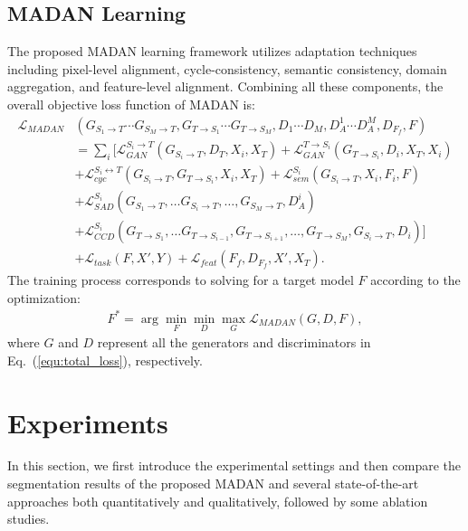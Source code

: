 \documentclass{article}
\begin{document}
\subsection{MADAN Learning}
The proposed MADAN learning framework utilizes adaptation techniques including pixel-level alignment, cycle-consistency, semantic consistency, domain aggregation, and feature-level alignment. Combining all these components, the overall objective loss function of MADAN is:
\begin{equation}
\begin{aligned}
\mathcal{L}_{MADAN}&(G_{S_1\rightarrow T} \cdots G_{S_M\rightarrow T}, G_{T\rightarrow S_1} \cdots G_{T\rightarrow S_M}, D_1\cdots D_M, D_A^1 \cdots D_A^M, D_{F_f}, F)\\
&=\sum\nolimits_i\Big[\mathcal{L}_{GAN}^{S_i\rightarrow T}(G_{S_{i}\rightarrow T},D_T, X_i, X_T)+\mathcal{L}_{GAN}^{T\rightarrow S_i}(G_{T\rightarrow S_{i}},D_{i}, X_T, X_{i})\\
&+\mathcal{L}_{cyc}^{S_i\leftrightarrow T}(G_{S_i\rightarrow T},G_{T\rightarrow S_i}, X_{i}, X_T) + \mathcal{L}_{sem}^{S_i}(G_{S_{i}\rightarrow T},X_i,F_{i}, F)\\
&+\mathcal{L}_{SAD}^{S_i}(G_{S_{1}\rightarrow T}, \dots G_{S_{i}\rightarrow T}, \dots,  G_{S_{M}\rightarrow T}, D_A^i)\\
&+\mathcal{L}_{CCD}^{S_i}(G_{T\rightarrow S_1}, \dots G_{T\rightarrow S_{i-1}}, G_{T\rightarrow S_{i+1}}, \dots, G_{T\rightarrow S_{M}}, G_{S_i\rightarrow T},D_i)\Big] \\
&+\mathcal{L}_{task}(F,X',Y) +\mathcal{L}_{feat}(F_f,D_{F_f}, X', X_T).
\end{aligned}
\label{equ:total_loss}
\end{equation}
The training process corresponds to solving for a target model $F$ according to the optimization:
\begin{equation}
\begin{aligned}
F^*=\arg\min_F\min_D\max_G\mathcal{L}_{MADAN}(G, D, F),
\end{aligned}
\label{equ:optimization}
\end{equation}
where $G$ and $D$ represent all the generators and discriminators in Eq.~(\ref{equ:total_loss}), respectively.












\section{Experiments}
In this section, we first introduce the experimental settings and then compare the segmentation results of the proposed MADAN and several state-of-the-art approaches both quantitatively and qualitatively, followed by some ablation studies.
\end{document}
